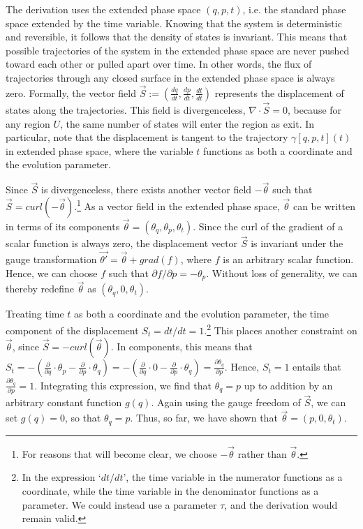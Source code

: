 \documentclass[12pt, english, twoside]{article} %
\renewcommand{\vector}[1]{\ensuremath{\vec{#1}}} %
\begin{document}
The derivation uses the extended phase space $(q, p, t)$, i.e. the standard phase space extended by the time variable. Knowing that the system is deterministic and reversible, it follows that the density of states is invariant. This means that possible trajectories of the system in the extended phase space are never pushed toward each other or pulled apart over time. In other words, the flux of trajectories through any closed surface in the extended phase space is always zero. Formally, the vector field $\vec{S} := (\frac{d q }{d t }, \frac{d p }{d t }, \frac{d t }{d t })$ represents the displacement of states along the trajectories. This field is divergenceless, $\nabla \cdot \vector{S} = 0$, because for any region $U$, the same number of states will enter the region as exit. In particular, note that the displacement is tangent to the trajectory $\gamma [q, p, t] (t)$ in extended phase space, where the variable $t$ functions as both a coordinate and the evolution parameter.

Since $\vector{S}$ is divergenceless, there exists another vector field $-\vector{\theta}$ such that $\vector{S} = curl(-\vector{\theta} )$.\footnote{For reasons that will become clear, we choose $-\vector{\theta}$ rather than $\vector{\theta}$.} As a vector field in the extended phase space, $\vector{\theta}$ can be written in terms of its components $\vector{\theta} = (\theta_q, \theta_p, \theta_t) $. Since the curl of the gradient of a scalar function is always zero, the displacement vector $\vector{S}$ is invariant under the gauge transformation $\vector{\theta'} =\vector{\theta} + grad(f)$, where $f$ is an arbitrary scalar function. Hence, we can choose $f$ such that $\partial f/ \partial p = -\theta_p $. Without loss of generality, we can thereby redefine $\vector{\theta}$ as $(\theta_q, 0, \theta_t) $.

Treating time $t$ as both a coordinate and the evolution parameter, the time component of the displacement $S_t = dt/ dt = 1$.\footnote{In the expression `$dt/dt$', the time variable in the numerator functions as a coordinate, while the time variable in the denominator functions as a parameter. We could instead use a parameter $\tau$, and the derivation would remain valid.} This places another constraint on $\vector{\theta} $, since $\vector{S} = -curl(\vector{\theta}) $. In components, this means that $S_t = - (\frac{\partial}{\partial q} \cdot \theta_p - \frac{\partial}{\partial p} \cdot \theta_q) = - (\frac{\partial}{\partial q} \cdot 0 - \frac{\partial}{\partial p} \cdot \theta_q) = \frac{\partial \theta_q}{\partial p}$. Hence, $S_t = 1$ entails that $\frac{\partial \theta_q}{\partial p} = 1$. Integrating this expression, we find that $\theta_q = p$ up to addition by an arbitrary constant function $g(q)$. Again using the gauge freedom of $\vector{S}$, we can set $g(q)=0$, so that $\theta_q = p$. Thus, so far, we have shown that $\vector{\theta} = (p, 0,\theta_t) $.
\end{document}
